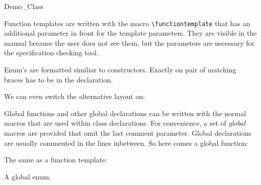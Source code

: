 \begin{class}{Demo_Class}
\def\CCalternateThreeColumn{\CCfalse}

Function templates are written with the macro \verb+\functiontemplate+
that has an additional parameter in front for the template
parameters. They are visible in the manual because the user does not
see them, but the parameters are necessary for the specification
checking tool.

\threecolumns{2.8cm}{8.7cm}


Enum's are formatted similiar to constructors. Exactly on pair of
matching braces has to be in the declaration.



We can even switch the alternative layout on:

\gdef\CCalternateThreeColumn{\CCtrue}


\threecolumns{3.5cm}{3.5cm}







\end{class}

Global functions and other global declarations can be written with the 
normal macros that are used within class declarations. For convenience, 
a set of {\em global\/} macros are provided that omit the last comment
parameter. Global declarations are usually commented in the lines
inbetween. So here comes a global function:

The same 
as a function template:

A global enum.

